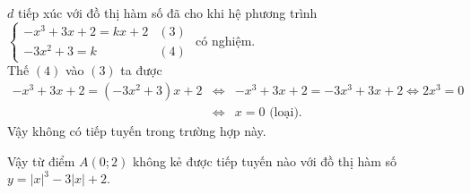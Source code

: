 \begin{ex}
{\begin{itemize}
\begin{itemize}
    $d$ tiếp xúc với đồ thị hàm số đã cho khi hệ phương trình $\begin{cases} -x^3+3x+2 = kx+2 & (3) \\ -3x^2+3 = k & (4)\end{cases}$ có nghiệm.\\
    Thế $(4)$ vào $(3)$ ta được
    \begin{eqnarray*}
     -x^3+3x+2=(-3x^2+3)x+2 &\Leftrightarrow & -x^3+3x+2=-3x^3+3x+2 \Leftrightarrow 2x^3=0\\
     &\Leftrightarrow & x = 0 \text{ (loại)}.
    \end{eqnarray*}
    Vậy không có tiếp tuyến trong trường hợp này.
   \end{itemize}
  \end{itemize}
  Vậy từ điểm $A(0;2)$ không kẻ được tiếp tuyến nào với đồ thị hàm số $y=|x|^3-3|x|+2$.
  }
\end{ex}


